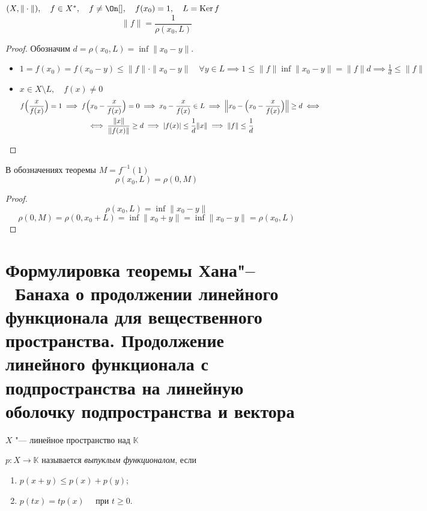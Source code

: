 \begin{theorem}
	$ (X, \|\cdot\|), \quad f \in X^*, \quad f \ne \On[], \quad f(x_0) = 1, \quad
	L = \operatorname{Ker} f $
	$$ \| f \| = \frac1{\rho(x_0, L)} $$
\end{theorem}

\begin{proof}
	Обозначим $ d = \rho(x_0, L) = \inf \|x_0 - y\| $.
	\begin{itemize}
		\item $ 1 = f(x_0) = f(x_0 - y) \le \|f\| \cdot \|x_0 - y\| \quad \forall y \in L \implies
			1 \le \|f\| \inf \|x_0 - y\| = \|f\|d \implies \frac1d \le \|f\| $
		\item $ x \in X \setminus L, \quad f(x) \ne 0 $
			\begin{multline*}
				f \Bigl( \frac{x}{f(x)} \Bigr) = 1 \implies
				f \Bigl( x_0 - \frac{x}{f(x)} \Bigr) = 0 \implies
				x_0 - \frac{x}{f(x)} \in L \implies
				\Bigl\| x_0 - \Bigl( x_0 - \frac{x}{f(x)} \Bigr) \Bigr\| \ge d \iff \\
				\iff \frac{\|x\|}{\|f(x)\|} \ge d \implies |f(x)| \le \frac1d \|x\| \implies
				\|f\| \le \frac1d
			\end{multline*}
	\end{itemize}
\end{proof}

\begin{remark}
	В обозначениях теоремы $ M = f^{-1}(1) $
	$$ \rho(x_0, L) = \rho(0, M) $$
\end{remark}

\begin{proof}
	$$ \rho(x_0, L) = \inf \|x_0 - y\| $$
	$$ \rho(0, M) = \rho(0, x_0 + L) = \inf \|x_0 + y\| = \inf \|x_0 - y\| = \rho(x_0, L) $$
\end{proof}

\section{Формулировка теоремы Хана\texorpdfstring{"--~}{--}Банаха о продолжении
линейного функционала для вещественного пространства.
Продолжение линейного функционала с подпространства на линейную оболочку подпространства и
вектора}

\begin{definition}
	$ X $ "--- линейное пространство над $ \mathbb K $

	$ p : X \to \mathbb K $ называется \emph{выпуклым функционалом}, если
	\begin{enumerate}
		\item $ p(x + y) \le p(x) + p(y) $;
		\item $ p(tx) = tp(x) \quad \text{ при } t \ge 0 $.
	\end{enumerate}
\end{definition}

